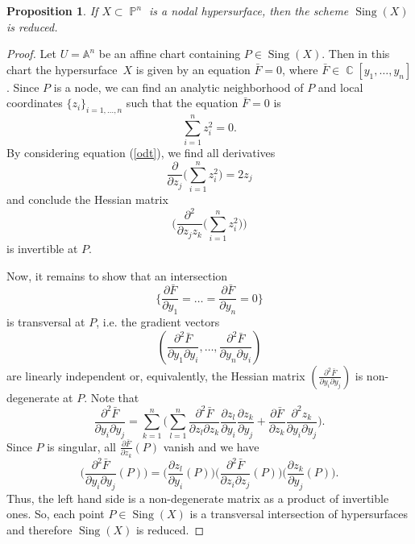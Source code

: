 \documentclass[a4paper,11pt,english,german]{amsart}
\DeclareMathOperator{\IP}{\mathbb{P}}
\DeclareMathOperator{\C}{\mathbb{C}}
\DeclareMathOperator{\Sing}{Sing}
\newtheorem{prop}[thm]{Proposition}
\theoremstyle{definition}
\begin{document}
\begin{prop} \label{reduced}
	If $X\subset\IP^{n}$ is a nodal hypersurface, then the scheme $\Sing(X)$ is reduced.
\end{prop}
\begin{proof}
Let $U=\mathbb{A}^n$ be an affine chart containing $P\in \Sing(X)$. Then in this chart the hypersurface~$X$ is given by an equation $\bar{F}=0$, where $\bar{F}\in \C[y_1,\dots,y_n]$. Since $P$ is a node, we can find an analytic neighborhood of $P$ and local coordinates $\{z_i\}_{i=1,\dots, n}$ such that the equation $\bar{F}=0$ is 
	\begin{equation}\label{odt}
				\sum\limits_{i=1}^{n} z_i^2=0\tag{5.3}.
	\end{equation}
	By considering equation (\ref{odt}), we find all derivatives
	$$ \frac{\partial}{\partial z_j}\big(\sum\limits_{i=1}^n z_i^2\big)=2z_j$$
	and conclude the Hessian matrix
	\begin{equation*}
		\bigg( \frac{\partial^2}{\partial z_j z_k}\big(\sum\limits_{i=1}^n z_i^2\big) \bigg)
	\end{equation*}
	is invertible at $P$.
	
	Now, it remains to show that an intersection 
	$$\{\frac{\partial \bar{F}}{\partial y_1}=\dots= \frac{\partial \bar{F}}{\partial y_n}=0\}$$
	is transversal at $P$, i.e. the gradient vectors 
	$$(\frac{\partial^2 \bar{F}}{\partial y_1 \partial y_i}, \dots, \frac{\partial^2 \bar{F}}{\partial y_n \partial y_i})$$
	are linearly independent or, equivalently, the Hessian matrix $(\frac{\partial^2 \bar{F}}{\partial y_i \partial y_j})$ is non-degenerate at $P$. Note that
	\begin{equation*}
		\frac{\partial^2 \bar{F}}{\partial y_i \partial y_j}=\sum\limits_{k=1}^n\big( \sum\limits_{l=1}^n \frac{\partial^2 \bar{F}}{\partial z_l \partial z_k} \frac{\partial z_l}{\partial y_i} \frac{\partial z_k}{\partial y_j}+ \frac{\partial \bar{F}}{\partial z_k} \frac{\partial^2 z_k}{\partial y_i \partial y_j} \big).
	\end{equation*}
Since $P$ is singular, all $\frac{\partial \bar{F}}{\partial z_k}(P)$ vanish and we have 
$$\bigg(\frac{\partial^2 \bar{F}}{\partial y_i \partial y_j}(P)\bigg)=\bigg( \frac{\partial z_l}{\partial y_i} (P) \bigg)\bigg( \frac{\partial^2 \bar{F}}{\partial z_i \partial z_j}(P)\bigg) \bigg( \frac{\partial z_k}{\partial y_j}(P)\bigg).$$ 
Thus, the left hand side is a non-degenerate matrix as a product of invertible ones. So, each point \mbox{$P\in \Sing(X)$} is a transversal intersection of hypersurfaces and therefore $\Sing(X)$ is reduced.
\end{proof}
\end{document}

